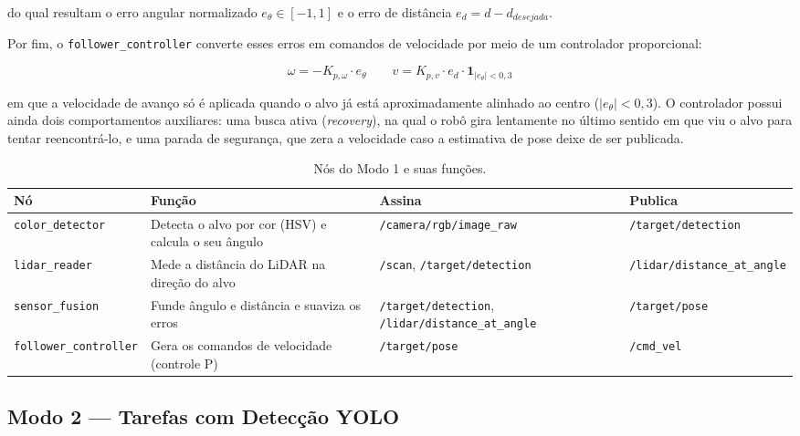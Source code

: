 do qual resultam o erro angular normalizado $e_\theta \in [-1, 1]$ e o erro de
distância $e_d = d - d_{desejada}$.

Por fim, o \texttt{follower\_controller} converte esses erros em comandos de
velocidade por meio de um controlador proporcional:

\begin{equation}
  \label{eq:controlador}
  \omega = -K_{p,\omega} \cdot e_\theta \qquad
  v = K_{p,v} \cdot e_d \cdot \mathbf{1}_{|e_\theta| < 0{,}3}
\end{equation}

em que a velocidade de avanço só é aplicada quando o alvo já está aproximadamente
alinhado ao centro ($|e_\theta| < 0{,}3$). O controlador possui ainda dois
comportamentos auxiliares: uma busca ativa (\textit{recovery}), na qual o
robô gira lentamente no último sentido em que viu o alvo para tentar reencontrá-lo,
e uma parada de segurança, que zera a velocidade caso a estimativa de pose
deixe de ser publicada.

\begin{table}[H]
\centering
\footnotesize
\caption{Nós do Modo 1 e suas funções.}
\label{tab:nos_modo1}
\begin{tabular}{@{}l p{3.3cm} p{3.5cm} p{3.3cm}@{}}
\hline
\textbf{Nó} & \textbf{Função} & \textbf{Assina} & \textbf{Publica} \\ \hline
\texttt{color\_detector} & Detecta o alvo por cor (HSV) e calcula o seu ângulo & \texttt{/camera/rgb/image\_raw} & \texttt{/target/detection} \\[2pt]
\texttt{lidar\_reader} & Mede a distância do LiDAR na direção do alvo & \texttt{/scan}, \texttt{/target/detection} & \texttt{/lidar/distance\_at\_angle} \\[2pt]
\texttt{sensor\_fusion} & Funde ângulo e distância e suaviza os erros & \texttt{/target/detection}, \texttt{/lidar/distance\_at\_angle} & \texttt{/target/pose} \\[2pt]
\texttt{follower\_controller} & Gera os comandos de velocidade (controle P) & \texttt{/target/pose} & \texttt{/cmd\_vel} \\ \hline
\end{tabular}
\end{table}

\subsection{Modo 2 — Tarefas com Detecção YOLO}
\label{sec:modo2}

